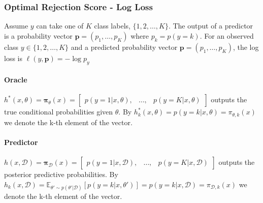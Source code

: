 \subsubsection{Optimal Rejection Score - Log Loss}
Assume $y$ can take one of $K$ class labels, $\{1, 2, \ldots, K\}$. The output of a predictor is a probability vector $\mathbf{p} = (p_1, \ldots, p_K)$ where $p_k = p(y=k)$. For an observed class $y\in\{1, 2, \ldots, K\}$ and a predicted probability vector $\mathbf{p}=(p_1, \dots, p_K)$, the log loss is $\ell(y, \mathbf{p}) = -\log p_{y}$

\paragraph{Oracle}
$h^*(x, \theta) = \mathbf{\pi}_\theta(x) = \begin{bmatrix}p(y=1|x,\theta), & \ldots, & p(y=K|x,\theta)\end{bmatrix}$ outputs the true conditional probabilities given $\theta$. By $h_k^*(x, \theta) = p(y=k|x,\theta) = \pi_{\theta,k}(x)$ we denote the k-th element of the vector.

\paragraph{Predictor}
$h(x, \mathcal{D}) = \mathbf{\pi}_{\mathcal{D}}(x) = \begin{bmatrix}p(y=1|x,\mathcal{D}), & \ldots, & p(y=K|x,\mathcal{D})\end{bmatrix}$ outputs the posterior predictive probabilities. By $h_k(x, \mathcal{D}) = \mathbb{E}_{\theta' \sim p(\theta'|\mathcal{D})}[p(y=k|x,\theta')] = p(y=k|x,\mathcal{D}) = \pi_{\mathcal{D},k}(x)$ we denote the k-th element of the vector.

